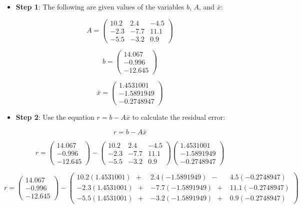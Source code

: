 \documentclass[
]{article}
\providecommand{\tightlist}{%
  \setlength{\itemsep}{0pt}\setlength{\parskip}{0pt}}
\begin{document}
\begin{itemize}
\tightlist
\item
  \textbf{Step 1}: The following are given values of the variables
  \(b\), \(A\), and \(\bar{x}\):
\end{itemize}

\[
  A = 
  \begin{pmatrix}
    10.2 & 2.4 & -4.5\\
    -2.3 & -7.7 & 11.1\\
    -5.5 & -3.2 & 0.9 
  \end{pmatrix}
  \]

\[
  b = 
  \begin{pmatrix}
    14.067 \\
    -0.996 \\
    -12.645 
  \end{pmatrix}
  \]

\[
  \bar{x} = 
  \begin{pmatrix}
    1.4531001 \\
    -1.5891949 \\
    -0.2748947 
  \end{pmatrix}
  \]

\begin{itemize}
\tightlist
\item
  \textbf{Step 2}: Use the equation \(r = b - A\bar{x}\) to calculate
  the residual error:
\end{itemize}

\[r = b - A\bar{x}\]

\[r = 
  \begin{pmatrix}
    14.067 \\
    -0.996 \\
    -12.645 
  \end{pmatrix}
  -
  \begin{pmatrix}
    10.2 & 2.4 & -4.5\\
    -2.3 & -7.7 & 11.1\\
    -5.5 & -3.2 & 0.9 
  \end{pmatrix}
  \begin{pmatrix}
    1.4531001 \\
    -1.5891949 \\
    -0.2748947 
  \end{pmatrix}\]

\[r = 
  \begin{pmatrix}
    14.067 \\
    -0.996 \\
    -12.645 
  \end{pmatrix}
  -
  \begin{pmatrix}
    10.2(1.4531001) \ \ + & 2.4(-1.5891949) \ \ -  & 4.5(-0.2748947)\\
    -2.3(1.4531001) \ \ + & -7.7(-1.5891949) \ \ +  & 11.1(-0.2748947)\\
    -5.5(1.4531001) \ \ + & -3.2(-1.5891949) \ \ +  & 0.9(-0.2748947) 
  \end{pmatrix}\]
\end{document}
